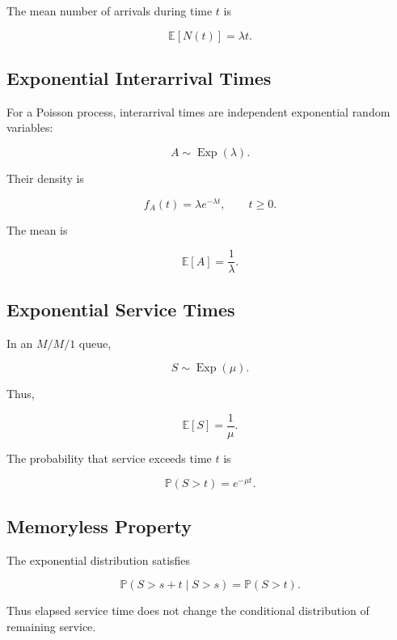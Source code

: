 The mean number of arrivals during time \(t\) is

\[
\boxed{
\mathbb{E}[N(t)]
=
\lambda t.
}
\]

\subsection{Exponential Interarrival Times}
\label{subsec:exponential-interarrival-times}

For a Poisson process, interarrival times are independent exponential
random variables:

\[
\boxed{
A
\sim
\operatorname{Exp}(\lambda).
}
\]

Their density is

\[
\boxed{
f_A(t)
=
\lambda e^{-\lambda t},
\qquad
t\geq0.
}
\]

The mean is

\[
\boxed{
\mathbb{E}[A]
=
\frac1\lambda.
}
\]

\subsection{Exponential Service Times}
\label{subsec:exponential-service-times}

In an \(M/M/1\) queue,

\[
\boxed{
S
\sim
\operatorname{Exp}(\mu).
}
\]

Thus,

\[
\boxed{
\mathbb{E}[S]
=
\frac1\mu.
}
\]

The probability that service exceeds time \(t\) is

\[
\boxed{
\mathbb{P}(S>t)
=
e^{-\mu t}.
}
\]

\subsection{Memoryless Property}
\label{subsec:queue-memoryless-property}

The exponential distribution satisfies

\[
\boxed{
\mathbb{P}(S>s+t\mid S>s)
=
\mathbb{P}(S>t).
}
\]

Thus elapsed service time does not change the conditional distribution of
remaining service.

